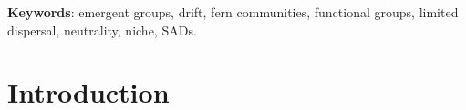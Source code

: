 \documentclass[12pt]{article}
\begin{document}


{\bf Keywords}: emergent groups, drift, fern communities, functional groups, limited dispersal, neutrality, niche, SADs.

\newpage

\section*{Introduction}
\end{document}

